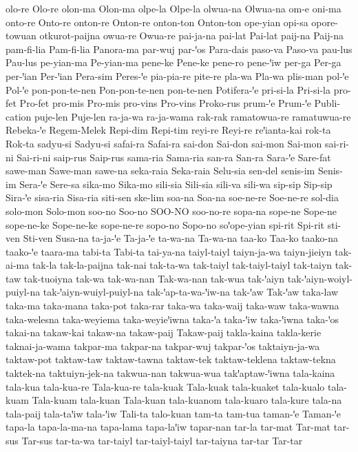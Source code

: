 {olo-re
Olo-re
olon-ma
Olon-ma
olpe-la
Olpe-la
olwua-na
Olwua-na
om-e
oni-ma
onto-re
Onto-re
onton-re
Onton-re
onton-ton
Onton-ton
ope-yian
opi-sa
opore-towuan
otkurot-paijna
owua-re
Owua-re
pai-ja-na
pai-lat
Pai-lat
paij-na
Paij-na
pam-fi-lia
Pam-fi-lia
Panora-ma
par-wuj
par-ꞌos
Para-dais
paso-va
Paso-va
pau-lus
Pau-lus
pe-yian-ma
Pe-yian-ma
pene-ke
Pene-ke
pene-ro
pene-ꞌiw
per-ga
Per-ga
per-ꞌian
Per-ꞌian
Pera-sim
Peres-ꞌe
pia-pia-re
pite-re
pla-wa
Pla-wa
plis-man
pol-ꞌe
Pol-ꞌe
pon-pon-te-nen
Pon-pon-te-nen
pon-te-nen
Potifera-ꞌe
pri-si-la
Pri-si-la
pro-fet
Pro-fet
pro-mis
Pro-mis
pro-vins
Pro-vins
Proko-rus
prum-ꞌe
Prum-ꞌe
Publi-cation
puje-len
Puje-len
ra-ja-wa
ra-ja-wama
rak-rak
ramatowua-re
ramatuwua-re
Rebeka-ꞌe
Regem-Melek
Repi-dim
Repi-tim
reyi-re
Reyi-re
reꞌianta-kai
rok-ta
Rok-ta
sadyu-si
Sadyu-si
safai-ra
Safai-ra
sai-don
Sai-don
sai-mon
Sai-mon
sai-ri-ni
Sai-ri-ni
saip-rus
Saip-rus
sama-ria
Sama-ria
san-ra
San-ra
Sara-ꞌe
Sare-fat
sawe-man
Sawe-man
sawe-na
seka-raia
Seka-raia
Selu-sia
sen-del
senis-im
Senis-im
Sera-ꞌe
Sere-sa
sika-mo
Sika-mo
sili-sia
Sili-sia
sili-va
sili-wa
sip-sip
Sip-sip
Sira-ꞌe
sisa-ria
Sisa-ria
siti-sen
ske-lim
soa-na
Soa-na
soe-ne-re
Soe-ne-re
sol-dia
solo-mon
Solo-mon
soo-no
Soo-no
SOO-NO
soo-no-re
sopa-na
sope-ne
Sope-ne
sope-ne-ke
Sope-ne-ke
sope-ne-re
sopo-no
Sopo-no
soꞌope-yian
spi-rit
Spi-rit
sti-ven
Sti-ven
Susa-na
ta-ja-ꞌe
Ta-ja-ꞌe
ta-wa-na
Ta-wa-na
taa-ko
Taa-ko
taako-na
taako-ꞌe
taara-ma
tabi-ta
Tabi-ta
tai-ya-na
taiyl-taiyl
taiyn-ja-wa
taiyn-jieiyn
tak-ai-ma
tak-la
tak-la-paijna
tak-nai
tak-ta-wa
tak-taiyl
tak-taiyl-taiyl
tak-taiyn
tak-taw
tak-tuoiyna
tak-wa
tak-wa-nan
Tak-wa-nan
tak-wua
tak-ꞌaiyn
tak-ꞌaiyn-woiyl-puiyl-na
tak-ꞌaiyn-wuiyl-puiyl-na
tak-ꞌap-ta-wa-ꞌiw-na
tak-ꞌaw
Tak-ꞌaw
taka-law
taka-ma
taka-mana
taka-pot
taka-rar
taka-wa
taka-waij
taka-waw
taka-wawna
taka-welesna
taka-weyiema
taka-weyieꞌiwna
taka-ꞌa
taka-ꞌiw
taka-ꞌiwna
taka-ꞌos
takai-na
takaw-kai
takaw-na
takaw-paij
Takaw-paij
takla-kaina
takla-kerie
taknai-ja-wama
takpar-ma
takpar-na
takpar-wuj
takpar-ꞌos
taktaiyn-ja-wa
taktaw-pot
taktaw-taw
taktaw-tawna
taktaw-tek
taktaw-teklena
taktaw-tekna
taktek-na
taktuiyn-jek-na
takwua-nan
takwua-wua
takꞌaptaw-ꞌiwna
tala-kaina
tala-kua
tala-kua-re
Tala-kua-re
tala-kuak
Tala-kuak
tala-kuaket
tala-kualo
tala-kuam
Tala-kuam
tala-kuan
Tala-kuan
tala-kuanom
tala-kuaro
tala-kure
tala-na
tala-paij
tala-taꞌiw
tala-ꞌiw
Tali-ta
talo-kuan
tam-ta
tam-tua
taman-ꞌe
Taman-ꞌe
tapa-la
tapa-la-ma-na
tapa-lama
tapa-laꞌiw
tapar-nan
tar-la
tar-mat
Tar-mat
tar-sus
Tar-sus
tar-ta-wa
tar-taiyl
tar-taiyl-taiyl
tar-taiyna
tar-tar
Tar-tar
}
